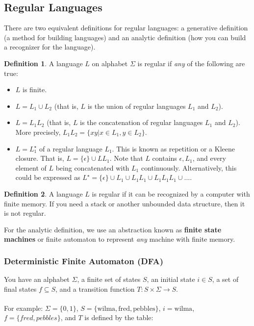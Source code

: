 \documentclass[]{article}
\theoremstyle{definition}
\newtheorem{defn}{Definition}[section]
\begin{document}
		\subsection{Regular Languages}
			There are two equivalent definitions for regular languages: a generative definition (a method for building languages) and an analytic definition (how you can build a recognizer for the language).
			\begin{defn}
				A language $L$ on alphabet $\Sigma$ is regular if \emph{any} of the following are true:
				\begin{itemize}
					\item $L$ is finite.
					\item $L = L_1 \cup L_2$ (that is, $L$ is the union of regular languages $L_1$ and $L_2$).
					\item $L = L_1 L_2$ (that is, $L$ is the concatenation of regular languages $L_1$ and $L_2$). More precisely, $L_1 L_2 = \{ xy | x \in L_1, y \in L_2 \}$.
					\item $L = L_1^\star$ of a regular language $L_1$. This is known as repetition or a Kleene closure. That is, $L = \{ \epsilon \} \cup L L_1$. Note that $L$ contains $\epsilon, L_1$, and every element of $L$ being concatenated with $L_1$ continuously. Alternatively, this could be expressed as $L^\star = \{ \epsilon \} \cup L_1 \cup L_1 L_1 \cup L_1 L_1 L_1 \cup \ldots$.
				\end{itemize}
			\end{defn}

			\begin{defn}
				A language $L$ is regular if it can be recognized by a computer with finite memory. If you need a stack or another unbounded data structure, then it is not regular.
			\end{defn}

			For the analytic definition, we use an abstraction known as \textbf{finite state machines} or {finite automaton} to represent \emph{any} machine with finite memory.
			\subsubsection{Deterministic Finite Automaton (DFA)}
				You have an alphabet $\Sigma$, a finite set of states $S$, an initial state $i \in S$, a set of final states $f \subseteq S$, and a transition function $T: S \times \Sigma \to S$.
				\\ \\
				For example: $\Sigma = \{ 0, 1 \}$, $S = \{ \text{wilma}, \text{fred}, \text{pebbles} \}$, $i = \text{wilma}$, $f = \{ fred, pebbles \}$, and $T$ is defined by the table:
\end{document}
